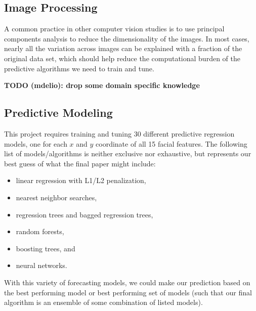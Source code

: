 \documentclass[conference]{IEEEtran}
\begin{document}
\subsection{Image Processing}
A common practice in other computer vision studies is to use principal components analysis to reduce the dimensionality of the images. In most cases, nearly all the variation across images can be explained with a fraction of the original data set, which should help reduce the computational burden of the predictive algorithms we need to train and tune.

\textbf{TODO (mdelio): drop some domain specific knowledge}

\subsection{Predictive Modeling}
This project requires training and tuning 30 different predictive regression models, one for each $x$ and $y$ coordinate of all 15 facial features. The following list of models/algorithms is neither exclusive nor exhaustive, but represents our best guess of what the final paper might include:
\begin{itemize}
\item linear regression with L1/L2 penalization,
\item nearest neighbor searches,
\item regression trees and bagged regression trees,
\item random forests,
\item boosting trees, and
\item neural networks.
\end{itemize}
With this variety of forecasting models, we could make our prediction based on the best performing model or best performing set of models (such that our final algorithm is an ensemble of some combination of listed models).

\end{document}
